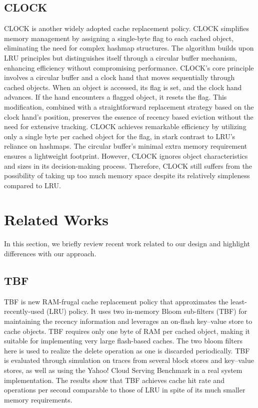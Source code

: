 \documentclass[conference]{IEEEtran}
\begin{document}
\subsection{CLOCK}
CLOCK is another widely adopted cache replacement policy. CLOCK simplifies memory management by assigning a single-byte flag to each cached object, eliminating the need for complex hashmap structures. The algorithm builds upon LRU principles but distinguishes itself through a circular buffer mechanism, enhancing efficiency without compromising performance.
CLOCK's core principle involves a circular buffer and a clock hand that moves sequentially through cached objects. When an object is accessed, its flag is set, and the clock hand advances. If the hand encounters a flagged object, it resets the flag. This modification, combined with a straightforward replacement strategy based on the clock hand's position, preserves the essence of recency based eviction without the need for extensive tracking.
CLOCK achieves remarkable efficiency by utilizing only a single byte per cached object for the flag, in stark contrast to LRU's reliance on hashmaps. The circular buffer's minimal extra memory requirement ensures a lightweight footprint. However, CLOCK ignores object characteristics and sizes in its decision-making process. Therefore, CLOCK still suffers from the possibility of taking up too much memory space despite its relatively simpleness compared to LRU.

\section{Related Works}
In this section, we briefly review recent work related to our design and highlight differences with our approach.

\subsection{TBF}
TBF is new RAM-frugal cache replacement policy that approximates the least-recently-used (LRU) policy. It uses two in-memory Bloom sub-filters (TBF) for maintaining the recency information and leverages an on-flash key–value store to cache objects. TBF requires only one byte of RAM per cached object, making it suitable for implementing very large flash-based caches. The two bloom filters here is used to realize the delete operation as one is discarded periodically. TBF is evaluated through simulation on traces from several block stores and key–value stores, as well as using the Yahoo! Cloud Serving Benchmark in a real system implementation. The results show that TBF achieves cache hit rate and operations per second comparable to those of LRU in spite of its much smaller memory requirements.
\end{document}
